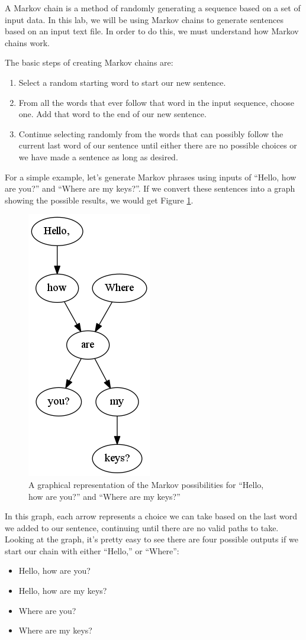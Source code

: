 \documentclass[11pt]{cselabheader}
\begin{document}
A Markov chain is a method of randomly generating a sequence based on a set of
input data. In this lab, we will be using Markov chains to generate sentences
based on an input text file. In order to do this, we must understand how Markov
chains work.

The basic steps of creating Markov chains are:
\begin{enumerate}
  \item Select a random starting word to start our new sentence.
  \item From all the words that ever follow that word in the input sequence,
    choose one. Add that word to the end of our new sentence.
  \item Continue selecting randomly from the words that can possibly follow the
    current last word of our sentence until either there are no possible choices
    or we have made a sentence as long as desired.
\end{enumerate}

For a simple example, let's generate Markov phrases using inputs of ``Hello, how
are you?'' and ``Where are my keys?''. If we convert these sentences into a
graph showing the possible results, we would get Figure \ref{mark_ex}.

\begin{figure}[h]
  \centering
  \includegraphics[width=0.2\linewidth]{lab10/example}
  \caption{A graphical representation of the Markov possibilities for ``Hello,
    how are you?'' and ``Where are my keys?''}
  \label{mark_ex}
\end{figure}

In this graph, each arrow represents a choice we can take based on the last word
we added to our sentence, continuing until there are no valid paths to take.
Looking at the graph, it's pretty easy to see there are four possible outputs if
we start our chain with either ``Hello,'' or ``Where'':

\begin{itemize}
  \item Hello, how are you?
  \item Hello, how are my keys?
  \item Where are you?
  \item Where are my keys?
\end{itemize}
\end{document}
